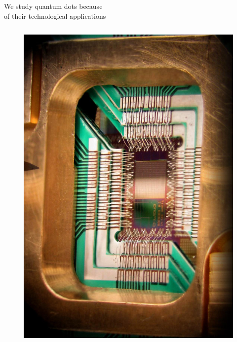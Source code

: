 \documentclass[12pt,usenames,dvipsnames]{beamer}
\begin{document}
\begin{frame}{We study quantum dots because \\ of their technological applications}
\begin{columns}
    \begin{column}{0.25\textwidth}
      \begin{figure}
        \includegraphics[width=\textwidth]{figures/devices/quantum_computer.jpg}
      \end{figure}
    \end{column}
  \end{columns}
\end{frame}
\end{document}
